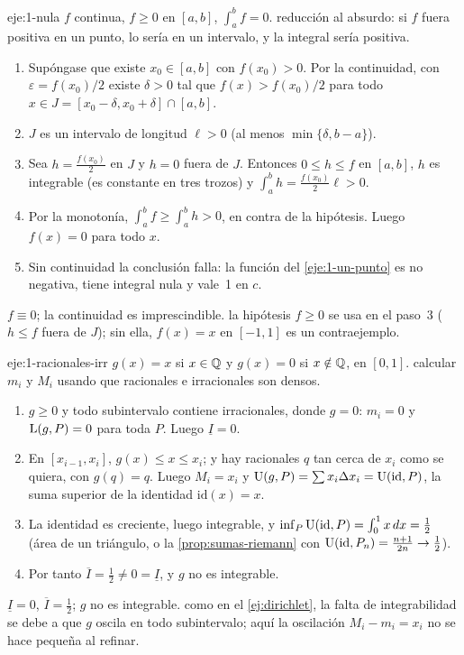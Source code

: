 \begin{solucion}{eje:1-nula}
\datos $f$ continua, $f\ge0$ en $[a,b]$, $\int_a^bf=0$.
\planteamiento reducción al absurdo: si $f$ fuera positiva en un punto, lo sería en un intervalo, y la integral sería positiva.
\pasos
\begin{enumerate}[label=\arabic*.]
  \item Supóngase que existe $x_0\in[a,b]$ con $f(x_0)>0$. Por la continuidad, con $\varepsilon=f(x_0)/2$ existe $\delta>0$ tal que $f(x)>f(x_0)/2$ para todo $x\in J=[x_0-\delta,x_0+\delta]\cap[a,b]$.
  \item $J$ es un intervalo de longitud $\ell>0$ (al menos $\min\{\delta,b-a\}$).
  \item Sea $h=\frac{f(x_0)}{2}$ en $J$ y $h=0$ fuera de $J$. Entonces $0\le h\le f$ en $[a,b]$, $h$ es integrable (es constante en tres trozos) y $\int_a^bh=\frac{f(x_0)}{2}\ell>0$.
  \item Por la monotonía, $\int_a^bf\ge\int_a^bh>0$, en contra de la hipótesis. Luego $f(x)=0$ para todo $x$.
  \item Sin continuidad la conclusión falla: la función del \cref{eje:1-un-punto} es no negativa, tiene integral nula y vale~1 en $c$.
\end{enumerate}
\resultado $f\equiv0$; la continuidad es imprescindible.
\comprobacion la hipótesis $f\ge0$ se usa en el paso~3 ($h\le f$ fuera de $J$); sin ella, $f(x)=x$ en $[-1,1]$ es un contraejemplo.
\end{solucion}

\begin{solucion}{eje:1-racionales-irr}
\datos $g(x)=x$ si $x\in\mathbb{Q}$ y $g(x)=0$ si $x\notin\mathbb{Q}$, en $[0,1]$.
\planteamiento calcular $m_i$ y $M_i$ usando que racionales e irracionales son densos.
\pasos
\begin{enumerate}[label=\arabic*.]
  \item $g\ge0$ y todo subintervalo contiene irracionales, donde $g=0$: $m_i=0$ y $\operatorname{L}(g,P)=0$ para toda $P$. Luego $\underline I=0$.
  \item En $[x_{i-1},x_i]$, $g(x)\le x\le x_i$; y hay racionales $q$ tan cerca de $x_i$ como se quiera, con $g(q)=q$. Luego $M_i=x_i$ y $\operatorname{U}(g,P)=\sum x_i\Delta x_i=\operatorname{U}(\mathrm{id},P)$, la suma superior de la identidad $\mathrm{id}(x)=x$.
  \item La identidad es creciente, luego integrable, y $\inf_P\operatorname{U}(\mathrm{id},P)=\int_0^{1}x\mathop{}\!d x=\frac12$ (área de un triángulo, o la \cref{prop:sumas-riemann} con $\operatorname{U}(\mathrm{id},P_n)=\frac{n+1}{2n}\to\frac12$).
  \item Por tanto $\overline I=\frac12\neq0=\underline I$, y $g$ no es integrable.
\end{enumerate}
\resultado $\underline I=0$, $\overline I=\frac12$; $g$ no es integrable.
\comprobacion como en el \cref{ej:dirichlet}, la falta de integrabilidad se debe a que $g$ oscila en todo subintervalo; aquí la oscilación $M_i-m_i=x_i$ no se hace pequeña al refinar.
\end{solucion}

